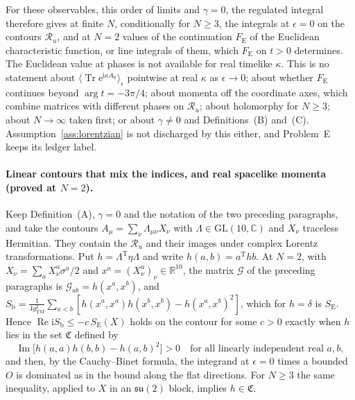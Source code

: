For these observables, this order of limits and \(\gamma=0\), the regulated integral therefore gives at finite \(N\), conditionally for \(N\ge3\), the integrals at \(\epsilon=0\) on the contours \(\mathcal R_u\), and at \(N=2\) values of the continuation \(F_{\mathrm E}\) of the Euclidean characteristic function, or line integrals of them, which \(F_{\mathrm E}\) on \(t>0\) determines. The Euclidean value at phases is not available for real timelike \(\kappa\). This is no statement about \(\langle\operatorname{Tr}\mathrm e^{\mathrm i\kappa A_0}\rangle_\epsilon\) pointwise at real \(\kappa\) as \(\epsilon\to0\); about whether \(F_{\mathrm E}\) continues beyond \(\arg t=-3\pi/4\); about momenta off the coordinate axes, which combine matrices with different phases on \(\mathcal R_u\); about holomorphy for \(N\ge3\); about \(N\to\infty\) taken first; or about \(\gamma\neq0\) and Definitions~(B) and~(C). Assumption~\ref{ass:lorentzian} is not discharged by this either, and Problem~E keeps its ledger label.

\paragraph{Linear contours that mix the indices, and real spacelike momenta (proved at \(N=2\)).}
Keep Definition~(A), \(\gamma=0\) and the notation of the two preceding paragraphs, and take the contours \(A_\mu=\sum_\nu\Lambda_{\mu\nu}X_\nu\) with \(\Lambda\in\mathrm{GL}(10,\mathbb C)\) and \(X_\nu\) traceless Hermitian. They contain the \(\mathcal R_u\) and their images under complex Lorentz transformations. Put \(h=\Lambda^{\mathrm T}\eta\Lambda\) and write \(h(a,b)=a^{\mathrm T}hb\). At \(N=2\), with \(X_\nu=\sum_aX_\nu^a\sigma^a/2\) and \(x^a=(X_\nu^a)_\nu\in\mathbb R^{10}\), the matrix \(\mathcal G\) of the preceding paragraphs is \(\mathcal G_{ab}=h(x^a,x^b)\), and \(S_{\mathrm b}=\tfrac1{4g_{\mathrm{YM}}^2}\sum_{a<b}[h(x^a,x^a)h(x^b,x^b)-h(x^a,x^b)^2]\), which for \(h=\delta\) is \(S_{\mathrm E}\). Hence \(\operatorname{Re}\mathrm iS_{\mathrm b}\le-c\,S_{\mathrm E}(X)\) holds on the contour for some \(c>0\) exactly when \(h\) lies in the set \(\mathfrak C\) defined by
\[
\operatorname{Im}\bigl[h(a,a)h(b,b)-h(a,b)^2\bigr]>0\quad\text{for all linearly independent real }a,b,
\]
and then, by the Cauchy--Binet formula, the integrand at \(\epsilon=0\) times a bounded \(O\) is dominated as in the bound along the flat directions. For \(N\ge3\) the same inequality, applied to \(X\) in an \(\mathfrak{su}(2)\) block, implies \(h\in\mathfrak C\).

